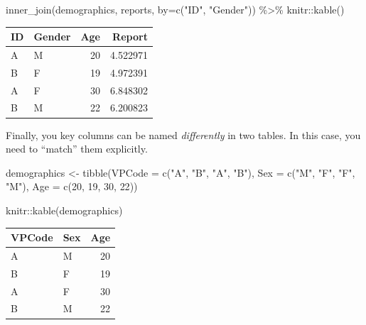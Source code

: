 \documentclass[
]{book}
\newenvironment{Shaded}{\begin{snugshade}}{\end{snugshade}}
\newcommand{\AttributeTok}[1]{\textcolor[rgb]{0.77,0.63,0.00}{#1}}
\newcommand{\DecValTok}[1]{\textcolor[rgb]{0.00,0.00,0.81}{#1}}
\newcommand{\FunctionTok}[1]{\textcolor[rgb]{0.00,0.00,0.00}{#1}}
\newcommand{\NormalTok}[1]{#1}
\newcommand{\OtherTok}[1]{\textcolor[rgb]{0.56,0.35,0.01}{#1}}
\newcommand{\SpecialCharTok}[1]{\textcolor[rgb]{0.00,0.00,0.00}{#1}}
\newcommand{\StringTok}[1]{\textcolor[rgb]{0.31,0.60,0.02}{#1}}
\begin{document}
\begin{Shaded}
\begin{Highlighting}[]
\FunctionTok{inner\_join}\NormalTok{(demographics, reports, }\AttributeTok{by=}\FunctionTok{c}\NormalTok{(}\StringTok{"ID"}\NormalTok{, }\StringTok{"Gender"}\NormalTok{)) }\SpecialCharTok{\%\textgreater{}\%}
\NormalTok{  knitr}\SpecialCharTok{::}\FunctionTok{kable}\NormalTok{()}
\end{Highlighting}
\end{Shaded}

\begin{tabular}{l|l|r|r}
\hline
ID & Gender & Age & Report\\
\hline
A & M & 20 & 4.522971\\
\hline
B & F & 19 & 4.972391\\
\hline
A & F & 30 & 6.848302\\
\hline
B & M & 22 & 6.200823\\
\hline
\end{tabular}

Finally, you key columns can be named \emph{differently} in two tables. In this case, you need to ``match'' them explicitly.

\begin{Shaded}
\begin{Highlighting}[]
\NormalTok{demographics }\OtherTok{\textless{}{-}} \FunctionTok{tibble}\NormalTok{(}\AttributeTok{VPCode =} \FunctionTok{c}\NormalTok{(}\StringTok{"A"}\NormalTok{, }\StringTok{"B"}\NormalTok{, }\StringTok{"A"}\NormalTok{, }\StringTok{"B"}\NormalTok{),}
                       \AttributeTok{Sex =} \FunctionTok{c}\NormalTok{(}\StringTok{"M"}\NormalTok{, }\StringTok{"F"}\NormalTok{, }\StringTok{"F"}\NormalTok{, }\StringTok{"M"}\NormalTok{),}
                       \AttributeTok{Age =} \FunctionTok{c}\NormalTok{(}\DecValTok{20}\NormalTok{, }\DecValTok{19}\NormalTok{, }\DecValTok{30}\NormalTok{, }\DecValTok{22}\NormalTok{))}

\NormalTok{knitr}\SpecialCharTok{::}\FunctionTok{kable}\NormalTok{(demographics)}
\end{Highlighting}
\end{Shaded}

\begin{tabular}{l|l|r}
\hline
VPCode & Sex & Age\\
\hline
A & M & 20\\
\hline
B & F & 19\\
\hline
A & F & 30\\
\hline
B & M & 22\\
\hline
\end{tabular}
\end{document}
